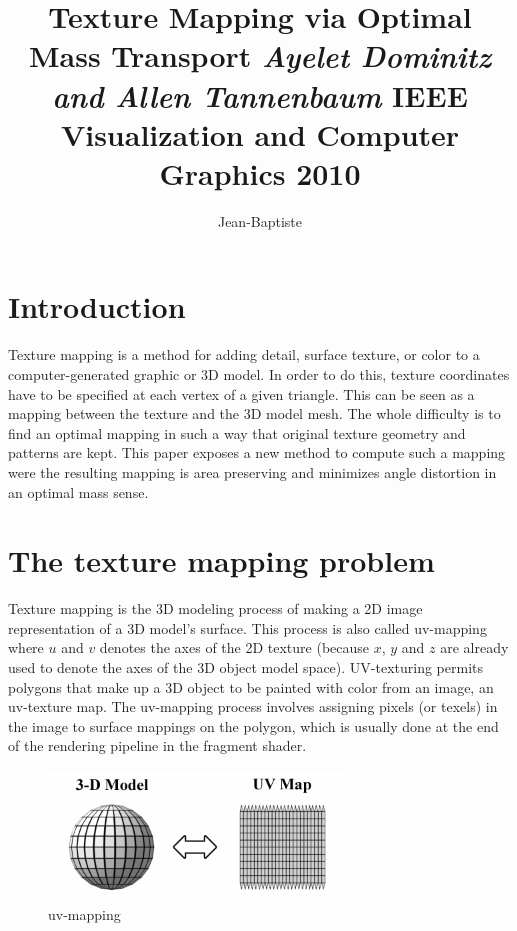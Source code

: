 \documentclass[11pt,a4paper]{article}
\title{
      \bsc{Paper Review}
      \vskip 1cm
      {\colorb\textbf{Texture Mapping via Optimal Mass Transport}}
      \vskip 1cm
      {\colorc\textit{Ayelet Dominitz and Allen Tannenbaum}}
      \vskip 1cm
      {IEEE Visualization and Computer Graphics 2010}
  }
\author{%
    Jean-Baptiste \bsc{Keck}
    \vskip 0.5cm
    \bsc{M2 Msiam}
}
\makeatletter
\newcommand{\colora}{\color{Cerulean}}
\def\maketitle{%
    \begin{flushleft}
        \normalfont\LARGE\par
    \end{flushleft}
    \vskip 2cm
    \begin{center}%
        {\colora\specialrule{.2em}{0em}{0em}}
        \vskip 1cm
        {\Huge \@title}%
        \vskip 1cm
        {\colora\specialrule{.2em}{0em}{0em}}
        \vskip 4cm
        {\Huge \@author\par}%
        \vskip 2cm
        {\Huge \@date\par}%
        \vskip 1cm

    \end{center}%
    \clearpage
}
\makeatother
\begin{document}
\pagestyle{fancy}

\maketitle


\section{Introduction}

Texture mapping is a method for adding detail, surface texture, or color to a computer-generated graphic or 3D model. 
In order to do this, texture coordinates have to be specified at each vertex of a given triangle. This can be seen as a mapping between the texture and the 3D model mesh. The whole difficulty is to find an optimal mapping in such a way that original texture geometry and patterns are kept.
This paper exposes a new method to compute such a mapping were the resulting mapping is area preserving and minimizes angle distortion in an optimal mass sense.

\section{The texture mapping problem}

Texture mapping is the 3D modeling process of making a 2D image representation of a 3D model's surface.
This process is also called uv-mapping where $u$ and $v$ denotes the axes of the 2D texture (because $x$, $y$ and $z$ are already used to denote the axes of the 3D object model space).
UV-texturing permits polygons that make up a 3D object to be painted with color from an image, an uv-texture map.
The uv-mapping process involves assigning pixels (or texels) in the image to surface mappings on the polygon, which is usually done at the end of the rendering pipeline in the fragment shader.

\vskip 0.3cm
\begin{figure}[H]
   \centering
   \includegraphics[width=8cm]{1.png}
   \caption{uv-mapping}
\end{figure}
\vskip 0.3cm
\end{document}
